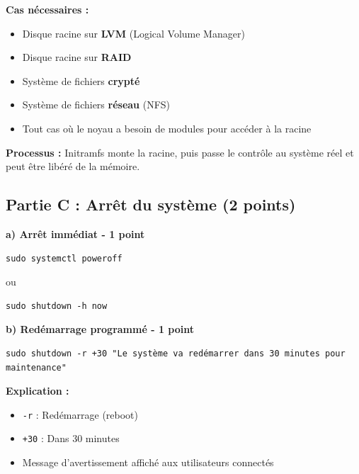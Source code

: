 \documentclass[12pt,a4paper]{article}
\begin{document}
\begin{answerbox}
\textbf{Cas nécessaires :}
\begin{itemize}
    \item Disque racine sur \textbf{LVM} (Logical Volume Manager)
    \item Disque racine sur \textbf{RAID}
    \item Système de fichiers \textbf{crypté}
    \item Système de fichiers \textbf{réseau} (NFS)
    \item Tout cas où le noyau a besoin de modules pour accéder à la racine
\end{itemize}

\textbf{Processus :} Initramfs monte la racine, puis passe le contrôle au système réel et peut être libéré de la mémoire.
\end{answerbox}

\subsection*{Partie C : Arrêt du système (2 points)}

\begin{answerbox}
\textbf{a) Arrêt immédiat - 1 point}

\begin{lstlisting}
sudo systemctl poweroff
\end{lstlisting}

ou

\begin{lstlisting}
sudo shutdown -h now
\end{lstlisting}

\textbf{b) Redémarrage programmé - 1 point}

\begin{lstlisting}
sudo shutdown -r +30 "Le système va redémarrer dans 30 minutes pour maintenance"
\end{lstlisting}

\textbf{Explication :}
\begin{itemize}
    \item \texttt{-r} : Redémarrage (reboot)
    \item \texttt{+30} : Dans 30 minutes
    \item Message d'avertissement affiché aux utilisateurs connectés
\end{itemize}
\end{answerbox}

\newpage

\end{document}
